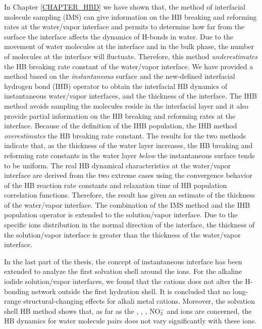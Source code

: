 In Chapter \ref{CHAPTER_HBD} we have shown that,
the method of interfacial molecule sampling (IMS) can give information on the HB breaking and reforming
rates at the water/vapor interface and permits to determine how far from the surface the interface affects the dynamics of H-bonds in water. 
Due to the movement of water molecules at the interface and in the bulk phase, the number of molecules at the interface will fluctuate.
Therefore, this method \emph{underestimates} the HB breaking rate constant of the water/vapor interface. 
We have provided a method based on the \emph{instantaneous} surface and the new-defined
interfacial hydrogen bond (IHB) operator to obtain the interfacial HB dynamics of instantaneous water/vapor interfaces, and the thickness of the interface.  
The IHB method avoids sampling the molecules reside in the interfacial layer and
it also provide partial information on the HB breaking and reforming rates at the interface. 
Because of the definition of the IHB population, the IHB method \emph{overestimates} the HB breaking rate constant. 
The results for the two methods indicate that,
as the thickness of the water layer increases,
the HB breaking and reforming rate constants in the water layer \emph{below} the instantaneous surface tends to be uniform. 
The real HB dynamical characteristics at the water/vapor interface 
are derived from the two extreme cases using the convergence behavior of the HB reaction rate constants and relaxation time 
of HB population correlation functions. 
Therefore, the result has given an estimate of the thickness of the water/vapor interface.  
The combination of the IMS method and the IHB population operator is extended to the solution/vapor interface. 
Due to the specific ions distribution in the normal direction of the interface,
the thickness of the solution/vapor interface is greater than the thickness of the water/vapor interface. 

In the last part of the thesis, the concept of instantaneous interface has been extended to analyze the first solvation shell around the ions.
For the alkaline iodide solution/vapor interfaces, we found 
that the cations does not alter the H-bonding network outside the first hydration shell. 
It is concluded that no long-range structural-changing effects for alkali metal cations.
Moreover, the solvation shell HB method shows that, 
as far as the \Li, \Na, \K, NO$^-_3$ and \I ions are concerned, 
the HB dynamics for water molecule pairs does not vary significantly with these ions.

